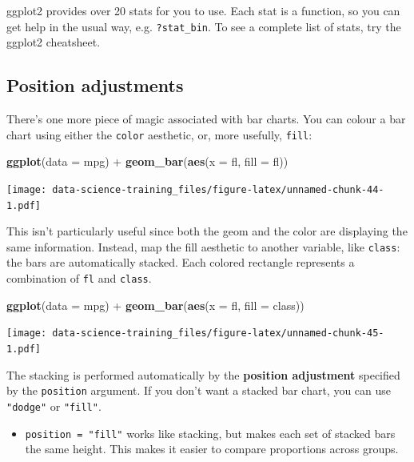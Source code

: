 \documentclass[]{book}
\newenvironment{Shaded}{\begin{snugshade}}{\end{snugshade}}
\newcommand{\KeywordTok}[1]{\textcolor[rgb]{0.13,0.29,0.53}{\textbf{{#1}}}}
\newcommand{\DataTypeTok}[1]{\textcolor[rgb]{0.13,0.29,0.53}{{#1}}}
\newcommand{\StringTok}[1]{\textcolor[rgb]{0.31,0.60,0.02}{{#1}}}
\newcommand{\NormalTok}[1]{{#1}}
\providecommand{\tightlist}{%
  \setlength{\itemsep}{0pt}\setlength{\parskip}{0pt}}
\theoremstyle{definition}
\theoremstyle{definition}
\theoremstyle{definition}
\theoremstyle{remark}
\begin{document}
ggplot2 provides over 20 stats for you to use. Each stat is a function,
so you can get help in the usual way, e.g. \texttt{?stat\_bin}. To see a
complete list of stats, try the ggplot2 cheatsheet.

\subsection{Position adjustments}\label{position-adjustments}

There's one more piece of magic associated with bar charts. You can
colour a bar chart using either the \texttt{color} aesthetic, or, more
usefully, \texttt{fill}:

\begin{Shaded}
\begin{Highlighting}[]
\KeywordTok{ggplot}\NormalTok{(}\DataTypeTok{data =} \NormalTok{mpg) +}\StringTok{ }
\StringTok{  }\KeywordTok{geom_bar}\NormalTok{(}\KeywordTok{aes}\NormalTok{(}\DataTypeTok{x =} \NormalTok{fl, }\DataTypeTok{fill =} \NormalTok{fl))}
\end{Highlighting}
\end{Shaded}

\texttt{[image: data-science-training\_files/figure-latex/unnamed-chunk-44-1.pdf]}

This isn't particularly useful since both the geom and the color are
displaying the same information. Instead, map the fill aesthetic to
another variable, like \texttt{class}: the bars are automatically
stacked. Each colored rectangle represents a combination of \texttt{fl}
and \texttt{class}.

\begin{Shaded}
\begin{Highlighting}[]
\KeywordTok{ggplot}\NormalTok{(}\DataTypeTok{data =} \NormalTok{mpg) +}\StringTok{ }
\StringTok{  }\KeywordTok{geom_bar}\NormalTok{(}\KeywordTok{aes}\NormalTok{(}\DataTypeTok{x =} \NormalTok{fl, }\DataTypeTok{fill =} \NormalTok{class))}
\end{Highlighting}
\end{Shaded}

\texttt{[image: data-science-training\_files/figure-latex/unnamed-chunk-45-1.pdf]}

The stacking is performed automatically by the \textbf{position
adjustment} specified by the \texttt{position} argument. If you don't
want a stacked bar chart, you can use \texttt{"dodge"} or
\texttt{"fill"}.

\begin{itemize}
\tightlist
\item
  \texttt{position\ =\ "fill"} works like stacking, but makes each set
  of stacked bars the same height. This makes it easier to compare
  proportions across groups.
\end{itemize}
\end{document}
